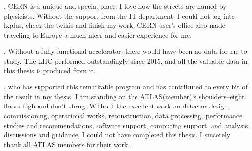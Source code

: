 






. CERN is a unique and special place. I love how the streets are named by physicists. Without the support from the IT department, I could not log into lxplus, check the twikis and finish my work. CERN user's office also made traveling to Europe a much nicer and easier experience for me. 

. Without a fully functional accelerator, there would have been no data for me to study. The LHC performed outstandingly since 2015, and all the valuable data in this thesis is produced from it. 

, who has supported this remarkable program and has contributed to every bit of the result in my thesis. I am standing on the ATLAS(member)'s shoulders--eight floors high and don't shrug. Without the excellent work on detector design, commissioning, operational works, reconstruction, data processing, performance studies and recommendations, software support, computing support, and analysis discussions and guidance, I could not have completed this thesis. I sincerely thank all ATLAS members for their work.

